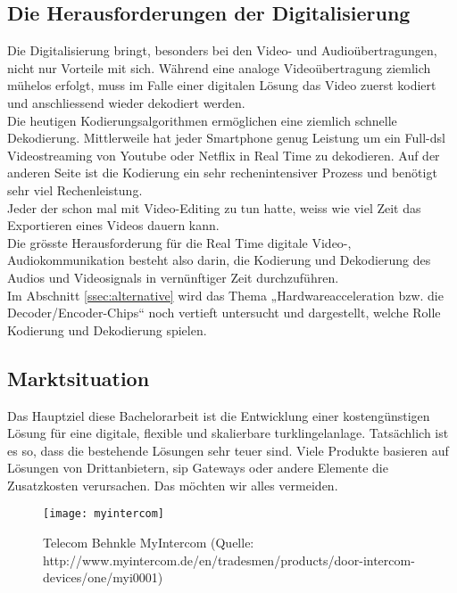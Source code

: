 \subsection{Die Herausforderungen der Digitalisierung}
Die Digitalisierung bringt, besonders bei den Video- und Audioübertragungen, nicht nur Vorteile mit sich.  Während eine analoge Videoübertragung ziemlich mühelos erfolgt, muss im Falle einer digitalen Lösung das Video zuerst kodiert und anschliessend wieder dekodiert werden.
\\
Die heutigen Kodierungsalgorithmen ermöglichen eine ziemlich schnelle Dekodierung. Mittlerweile hat jeder Smartphone genug Leistung um ein Full-\gls{dsl} Videostreaming von Youtube oder Netflix in Real Time zu dekodieren. Auf der anderen Seite ist die Kodierung ein sehr rechenintensiver Prozess und benötigt sehr viel Rechenleistung.
\\
Jeder der schon mal mit Video-Editing zu tun hatte, weiss wie viel Zeit das Exportieren eines Videos dauern kann.
\\
Die grösste Herausforderung für die Real Time digitale Video-, Audiokommunikation besteht also darin, die Kodierung und Dekodierung des Audios und Videosignals in vernünftiger Zeit durchzuführen.
\\
Im Abschnitt \ref{ssec:alternative} wird das Thema „Hardwareacceleration bzw. die Decoder/Encoder-Chips“ noch vertieft untersucht und dargestellt, welche Rolle Kodierung und Dekodierung spielen. 

\subsection{Marktsituation}
\label{sec:marktsituation}
Das Hauptziel diese Bachelorarbeit ist die Entwicklung einer kostengünstigen Lösung für eine digitale, flexible und skalierbare \gls{turklingelanlage}. Tatsächlich ist es so, dass die bestehende Lösungen sehr teuer sind. Viele Produkte basieren auf Lösungen von Drittanbietern, \gls{sip} Gateways oder andere Elemente die Zusatzkosten verursachen. Das möchten wir alles vermeiden.

\begin{figure}[htb!]
	\begin{center}
		\texttt{[image: myintercom]}
		\caption[Telecom Behnkle MyIntercom]{Telecom Behnkle MyIntercom (Quelle: http://www.myintercom.de/en/tradesmen/products/door-intercom-devices/one/myi0001)}
		\label{fig:myintercom}
	\end{center}
\end{figure}

